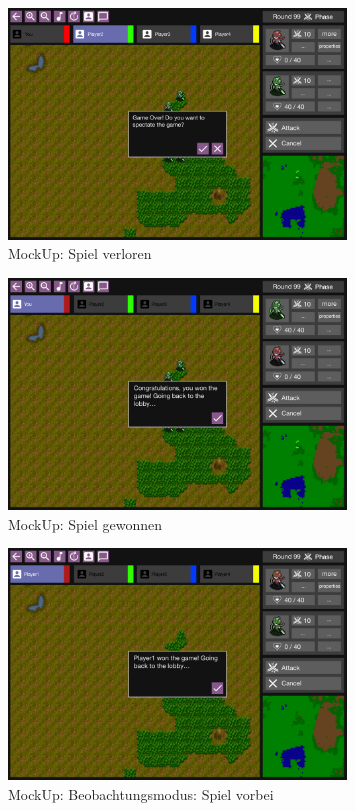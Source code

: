 \documentclass[12pt, titlepage]{scrartcl}
\begin{document}
			        \begin{figure}[H] 
    				    \centering
    				    \includegraphics[width=0.8\textwidth]{images/mockUps/GameOver.png}
    				    \caption{MockUp: Spiel verloren}
    				    \label{Game_Lost}
			        \end{figure}
			        \begin{figure}[H] 
    				    \centering
    				    \includegraphics[width=0.8\textwidth]{images/mockUps/GameWon.png}
    				    \caption{MockUp: Spiel gewonnen}
    				    \label{Game_Won}
			        \end{figure}
			        \begin{figure}[H] 
    				    \centering
    				    \includegraphics[width=0.8\textwidth]{images/mockUps/SpactatorEnd.png}
    				    \caption{MockUp: Beobachtungsmodus: Spiel vorbei}
    				    \label{Spactator_End}
			        \end{figure}
\end{document}
